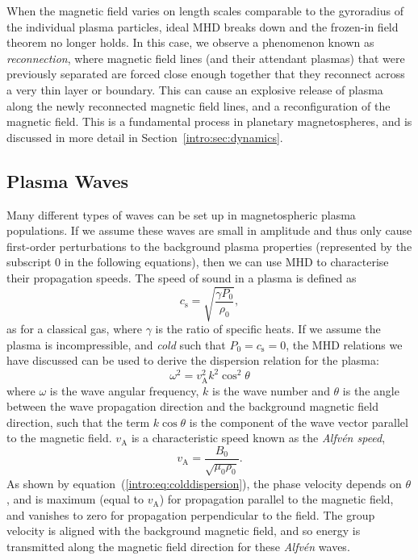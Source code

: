 When the magnetic field varies on length scales comparable to the gyroradius of the individual plasma particles, ideal MHD breaks down and the frozen-in field theorem no longer holds. In this case, we observe a phenomenon known as \textit{reconnection}, where magnetic field lines (and their attendant plasmas) that were previously separated are forced close enough together that they reconnect across a very thin layer or boundary. This can cause an explosive release of plasma along the newly reconnected magnetic field lines, and a reconfiguration of the magnetic field. This is a fundamental process in planetary magnetospheres, and is discussed in more detail in Section~\ref{intro:sec:dynamics}. 

\subsection{Plasma Waves}
Many different types of waves can be set up in magnetospheric plasma populations. If we assume these waves are small in amplitude and thus only cause first-order perturbations to the background plasma properties (represented by the subscript 0 in the following equations), then we can use MHD to characterise their propagation speeds. The speed of sound in a plasma is defined as
\begin{equation}
c_\mathrm{s} = \sqrt{\frac{\gamma P_0}{\rho_0}},
\end{equation}
as for a classical gas, where $\gamma$ is the ratio of specific heats. If we assume the plasma is incompressible, and \textit{cold} such that $P_0 = c_\mathrm{s} = 0$, the MHD relations we have discussed can be used to derive the dispersion relation for the plasma:
\begin{equation}\label{intro:eq:colddispersion}
\omega^2 = {v}_\mathrm{A}^2k^2\cos^2{\theta}
\end{equation}
where $\omega$ is the wave angular frequency, $k$ is the wave number and $\theta$ is the angle between the wave propagation direction and the background magnetic field direction, such that the term $k\cos{\theta}$ is the component of the wave vector parallel to the magnetic field. $v_\mathrm{A}$ is a characteristic speed known as the \textit{Alfv\'en speed},
\begin{equation}
v_\mathrm{A} = \frac{B_0}{\sqrt{\mu_0\rho_0}}.
\end{equation}
As shown by equation~(\ref{intro:eq:colddispersion}), the phase velocity depends on $\theta$, and is maximum (equal to $v_\mathrm{A}$) for propagation parallel to the magnetic field, and vanishes to zero for propagation perpendicular to the field. The group velocity is aligned with the background magnetic field, and so energy is transmitted along the magnetic field direction for these \textit{Alfv\'en} waves. %

